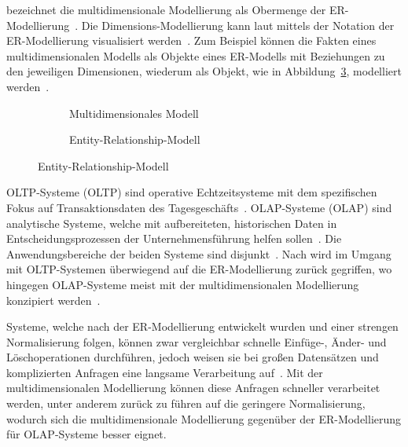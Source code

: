 \documentclass[
  language=german, %
  type=bachelor%
]{isthesis}
\begin{document}
\begin{content}
  \textsc{\citeauthor{ballard1998data}} bezeichnet die multidimensionale Modellierung
  als Obermenge der ER-Modellierung~\cite[][S. 47]{ballard1998data}. Die
  Dimensions-Modellierung kann laut \textsc{\citeauthor{ballard1998data}}
  mittels der Notation der ER-Modellierung visualisiert werden~\cite[][S.
  47]{ballard1998data}. Zum Beispiel können die Fakten eines multidimensionalen Modells
  als Objekte eines ER-Modells mit Beziehungen zu den jeweiligen Dimensionen,
  wiederum als Objekt, wie in Abbildung~\ref{vergleich-erm}, modelliert
  werden~\cite[][S. 48]{ballard1998data}. 

  \begin{figure}[caption={Vergleich multidimensionale Modellierung und ERM}, label={}]
    \centering
    \begin{subfigure}{.49\textwidth}
      \centering
      \resizebox{\linewidth}{!}{}
      \caption{Multidimensionales Modell}
      \label{}
    \end{subfigure}
    \begin{subfigure}{.49\textwidth}
      \centering
      \resizebox{\linewidth}{!}{}
      \caption{Entity-Relationship-Modell}
      \label{vergleich-erm}
    \end{subfigure}
  \end{figure}

  \acrlong{OLTP}-Systeme (\acrshort{OLTP}) sind operative Echtzeitsysteme mit dem
  spezifischen Fokus auf Transaktionsdaten des Tagesgeschäfts~\cite[][S.
  11]{gabriel2009data}. \acrlong{OLAP}-Systeme (\acrshort{OLAP}) sind analytische Systeme,
  welche mit aufbereiteten, historischen Daten in Entscheidungsprozessen der
  Unternehmensführung helfen sollen~\cite[][S. 1]{chaudhuri1997overview}. Die
  Anwendungsbereiche der beiden Systeme sind disjunkt~\cite[][S.
  334]{chamoni2000line}. Nach \textsc{\citeauthor{phipps2002automating}} wird
  im Umgang mit \acrshort{OLTP}-Systemen überwiegend auf die ER-Modellierung
  zurück gegriffen, wo hingegen \acrshort{OLAP}-Systeme meist mit der
  multidimensionalen Modellierung konzipiert werden~\cite[][S.
  2]{phipps2002automating}. 

  Systeme, welche nach der ER-Modellierung entwickelt wurden und einer strengen
  Normalisierung folgen, können zwar vergleichbar schnelle Einfüge-, Änder- und
  Löschoperationen durchführen, jedoch weisen sie bei großen Datensätzen und
  komplizierten Anfragen eine langsame Verarbeitung auf~\cite[][S.
  52]{ballard2012dimensional}. Mit der multidimensionalen Modellierung können diese
  Anfragen schneller verarbeitet werden\cite[][S.  52]{ballard2012dimensional},
  unter anderem zurück zu führen auf die geringere Normalisierung, wodurch
  sich die multidimensionale Modellierung gegenüber der ER-Modellierung für
  \acrshort{OLAP}-Systeme besser eignet.



\end{content}
\end{document}
